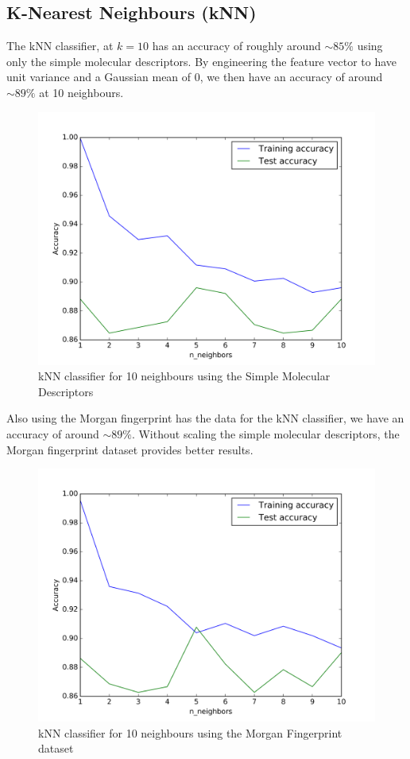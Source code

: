 \documentclass[a4paper,12pt]{report}
\begin{document}
		\subsection{K-Nearest Neighbours (kNN)}
		The kNN classifier, at $k=10$ has an accuracy of roughly around $\sim85\%$ using only the simple molecular descriptors. By engineering the feature vector to have unit variance and a Gaussian mean of 0, we then have an accuracy of around $\sim89\%$ at 10 neighbours. 
			\begin{figure}[H]
				\centering
				\includegraphics[width=\textwidth,scale=1,totalheight=0.4\textheight]{images/knn_molecular_descriptors}
				\caption{kNN classifier for 10 neighbours using the Simple Molecular Descriptors}
				\label{fig:knn_smd}
			\end{figure}
		Also using the Morgan fingerprint has the data for the kNN classifier, we have an accuracy of around $\sim89\%$. Without scaling the simple molecular descriptors, the Morgan fingerprint dataset provides better results.
			\begin{figure}[H]
				\centering
				\includegraphics[width=\textwidth,scale=1,totalheight=0.4\textheight]{images/knn_morgan_dice_fingerprint}
				\caption{kNN classifier for 10 neighbours using the Morgan Fingerprint dataset}
				\label{fig:knn_mfps}
			\end{figure}
		
\end{document}
